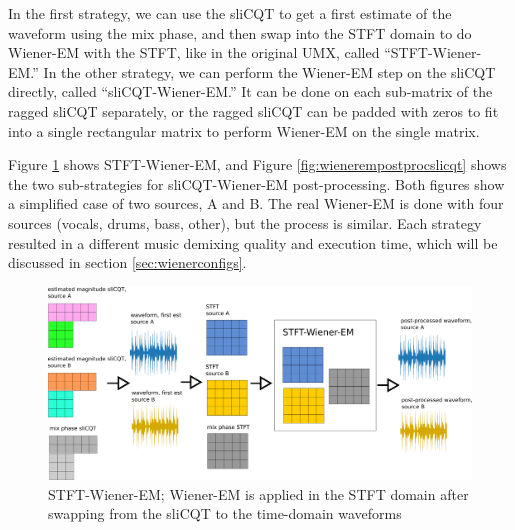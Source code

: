 \documentclass[report.tex]{subfiles}
\begin{document}
In the first strategy, we can use the sliCQT to get a first estimate of the waveform using the mix phase, and then swap into the STFT domain to do Wiener-EM with the STFT, like in the original UMX, called ``STFT-Wiener-EM.'' In the other strategy, we can perform the Wiener-EM step on the sliCQT directly, called ``sliCQT-Wiener-EM.'' It can be done on each sub-matrix of the ragged sliCQT separately, or the ragged sliCQT can be padded with zeros to fit into a single rectangular matrix to perform Wiener-EM on the single matrix.

Figure \ref{fig:wienerempostprocstft} shows STFT-Wiener-EM, and Figure \ref{fig:wienerempostprocslicqt} shows the two sub-strategies for sliCQT-Wiener-EM post-processing. Both figures show a simplified case of two sources, A and B. The real Wiener-EM is done with four sources (vocals, drums, bass, other), but the process is similar. Each strategy resulted in a different music demixing quality and execution time, which will be discussed in section \ref{sec:wienerconfigs}.

\begin{figure}[ht]
	\centering
	\includegraphics[width=\textwidth]{./images-blockdiagrams/wienerem_stft.png}
	\caption{STFT-Wiener-EM; Wiener-EM is applied in the STFT domain after swapping from the sliCQT to the time-domain waveforms}
	\label{fig:wienerempostprocstft}
\end{figure}
\end{document}
